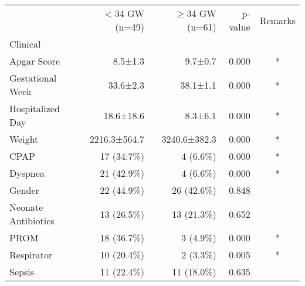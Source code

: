 \begin{tabular}{lrrrc}
\toprule
{} & $<$34 GW (n=49) & $\ge$34 GW (n=61) & p-value & Remarks \\
Clinical            &               &               &         &         \\
\midrule
Apgar Score         &       8.5±1.3 &       9.7±0.7 &   0.000 &       * \\
Gestational Week    &      33.6±2.3 &      38.1±1.1 &   0.000 &       * \\
Hospitalized Day    &     18.6±18.6 &       8.3±6.1 &   0.000 &       * \\
Weight              &  2216.3±564.7 &  3240.6±382.3 &   0.000 &       * \\
CPAP                &    17 (34.7\%) &      4 (6.6\%) &   0.000 &       * \\
Dyspnea             &    21 (42.9\%) &      4 (6.6\%) &   0.000 &       * \\
Gender              &    22 (44.9\%) &    26 (42.6\%) &   0.848 &         \\
Neonate Antibiotics &    13 (26.5\%) &    13 (21.3\%) &   0.652 &         \\
PROM                &    18 (36.7\%) &      3 (4.9\%) &   0.000 &       * \\
Respirator          &    10 (20.4\%) &      2 (3.3\%) &   0.005 &       * \\
Sepsis              &    11 (22.4\%) &    11 (18.0\%) &   0.635 &         \\
\bottomrule
\end{tabular}

